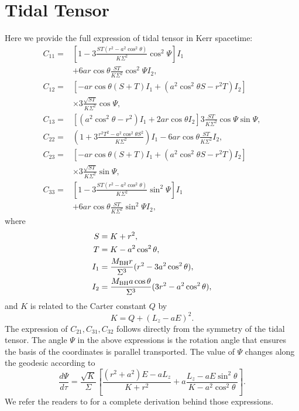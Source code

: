 \documentclass[useAMS,usenatbib]{mn2e}
\def\mBH{M_{\rm BH}}
\newcommand{\lrb}[1]{\left({#1}\right)}
\newcommand{\lrsb}[1]{\left[{#1}\right]}
\begin{document}
\section{Tidal Tensor}\label{sec:tidal_tensor}
Here we provide the full expression of tidal tensor in Kerr spacetime:
\allowdisplaybreaks
\begin{align}
C_{11} = & \lrsb{1-3\frac{ST(r^{2}-a^{2}\cos^{2}\theta)}{K\Sigma^{2}}\cos^{2}\Psi}I_{1}\nonumber\\
         & +6ar\cos\theta\frac{ST}{K\Sigma^{2}}\cos^{2}\Psi I_{2},\\
C_{12} = & \lrsb{-ar\cos\theta(S+T)I_{1}+(a^{2}\cos^{2}\theta S-r^{2}T)I_{2}}\nonumber\\
         & \times3\frac{\sqrt{ST}}{K\Sigma^{2}}\cos\Psi,\\
C_{13} = & \lrsb{(a^{2}\cos^{2}\theta-r^{2})I_{1}+2ar\cos\theta I_{2}}3\frac{ST}{K\Sigma^{2}}\cos\Psi\sin\Psi,\\
C_{22} = & \lrb{1+3\frac{r^{2}T^{2}-a^{2}\cos^{2}\theta S^{2}}{K\Sigma^{2}}}I_{1}-6ar\cos\theta\frac{ST}{K\Sigma^{2}}I_{2},\\
C_{23} = & \lrsb{-ar\cos\theta(S+T)I_{1}+(a^{2}\cos^{2}\theta S-r^{2}T)I_{2}}\nonumber\\
         & \times3\frac{\sqrt{ST}}{K\Sigma^{2}}\sin\Psi,\\
C_{33} = & \lrsb{1-3\frac{ST(r^{2}-a^{2}\cos^{2}\theta)}{K\Sigma^{2}}\sin^{2}\Psi}I_{1}\nonumber\\
         & +6ar\cos\theta\frac{ST}{K\Sigma^{2}}\sin^{2}\Psi I_{2},
\end{align}
where
\begin{align}
S & =K+r^{2},\\
T & =K-a^{2}\cos^{2}\theta,\\
I_{1} & =\frac{\mBH r}{\Sigma^{3}}(r^{2}-3a^{2}\cos^{2}\theta),\\
I_{2} & =\frac{\mBH a\cos\theta}{\Sigma^{3}}(3r^{2}-a^{2}\cos^{2}\theta),
\end{align}
and $K$ is related to the Carter constant $Q$ by
\begin{equation}
    K=Q+\lrb{L_z-aE}^2.
\end{equation}
The expression of $C_{21},C_{31},C_{32}$ follows directly from the symmetry of the tidal tensor.
The angle $\Psi$ in the above expressions is the rotation angle that ensures the basis of the coordinates is parallel transported.
The value of $\Psi$ changes along the geodesic according to
\begin{equation}
    \frac{d\Psi}{d\tau}=\frac{\sqrt{K}}{\Sigma}\lrsb{\frac{(r^{2}+a^{2})E-aL_{z}}{K+r^{2}}+a\frac{L_{z}-aE\sin^{2}\theta}{K-a^{2}\cos^{2}\theta}}.
\end{equation}
We refer the readers to \cite{Marck1983} for a complete derivation behind those expressions.
\end{document}
